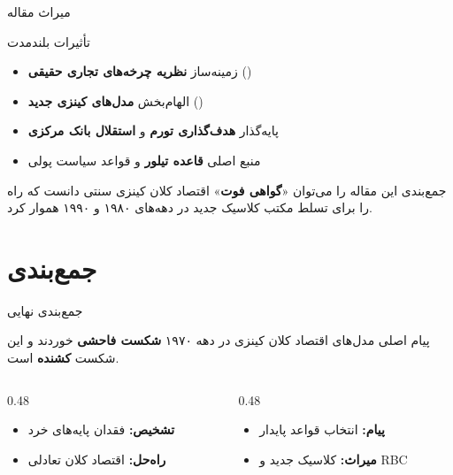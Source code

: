 \documentclass[aspectratio=169,11pt]{beamer}
\newcommand{\highlight}[1]{\textcolor{AccentOrange}{\textbf{#1}}}
\newcommand{\important}[1]{\textcolor{AlertRed}{\textbf{#1}}}
\newcommand{\keyword}[1]{\textcolor{MainBlue}{\textbf{#1}}}
\begin{document}
\begin{frame}{میراث مقاله}
	\begin{block}{تأثیرات بلندمدت}
		\begin{itemize}
			\item زمینه‌ساز \keyword{نظریه چرخه‌های تجاری حقیقی} ()
			\item الهام‌بخش \highlight{مدل‌های کینزی جدید} ()
			\item پایه‌گذار \important{هدف‌گذاری تورم} و \important{استقلال بانک مرکزی}
			\item منبع اصلی \highlight{قاعده تیلور} و قواعد سیاست پولی
		\end{itemize}
	\end{block}
	\vspace{0.3cm}
	\begin{exampleblock}{جمع‌بندی}
		\centering
		این مقاله را می‌توان «\important{گواهی فوت}» اقتصاد کلان کینزی سنتی دانست که راه را برای تسلط مکتب کلاسیک جدید در دهه‌های ۱۹۸۰ و ۱۹۹۰ هموار کرد.
	\end{exampleblock}
\end{frame}

\section{جمع‌بندی}

\begin{frame}{جمع‌بندی نهایی}
	\begin{block}{پیام اصلی}
		\centering
		\large
		مدل‌های اقتصاد کلان کینزی در دهه ۱۹۷۰ \important{شکست فاحشی} خوردند و این شکست \important{کشنده} است.
	\end{block}
	\vspace{0.5cm}
	\begin{LTR}
		\begin{columns}[T]
			\begin{column}{0.48\textwidth}
				\begin{RTL}
					\begin{itemize}
						\item \keyword{تشخیص:} فقدان پایه‌های خرد
						\item \keyword{راه‌حل:} اقتصاد کلان تعادلی
					\end{itemize}
				\end{RTL}
			\end{column}
			\hfill
			\begin{column}{0.48\textwidth}
				\begin{RTL}
					\begin{itemize}
						\item \keyword{پیام:} انتخاب قواعد پایدار
						\item \keyword{میراث:} کلاسیک جدید و RBC
					\end{itemize}
				\end{RTL}
			\end{column}
		\end{columns}
	\end{LTR}
\end{frame}
\end{document}
